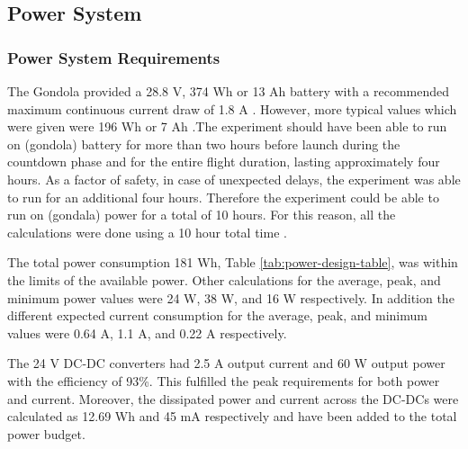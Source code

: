 \pagebreak
\subsection{Power System}

\subsubsection{Power System Requirements}
\begin{centering}
The Gondola provided a 28.8 V, 374 Wh or 13 Ah battery with a recommended maximum continuous current draw of 1.8 A . However, more typical values which were given were 196 Wh or 7 Ah \cite{BexusManual}.The experiment should have been able to run on (gondola) battery for more than two hours before launch during the countdown phase and for the entire flight duration, lasting approximately four hours. As a factor of safety, in case of unexpected delays, the experiment was able to run for an additional four hours. Therefore the experiment could be able to run on (gondala) power for a total of 10 hours. For this reason, all the calculations were done using a 10 hour total time \cite{BexusManual}.
\end{centering}





The total power consumption 181 Wh, Table \ref{tab:power-design-table}, was within the limits of the available power. Other calculations for the average, peak, and minimum power values were 24 W, 38 W, and 16 W respectively. In addition the different expected current consumption for the average, peak, and minimum values were 0.64 A, 1.1 A, and 0.22 A respectively.

The 24 V DC-DC converters had 2.5 A output current and 60 W output power with the efficiency of 93\%. This fulfilled the peak requirements for both power and current. Moreover, the dissipated power and current across the DC-DCs were calculated as 12.69 Wh and 45 mA respectively and have been added to the total power budget. 



\raggedbottom
